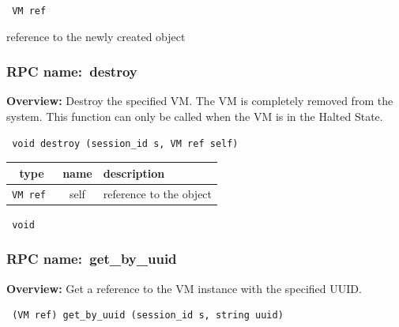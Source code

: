 \vspace{0.3cm}

{\tt 
VM ref
}


reference to the newly created object
\vspace{0.3cm}
\vspace{0.3cm}
\vspace{0.3cm}
\subsubsection{RPC name:~destroy}

{\bf Overview:} 
Destroy the specified VM.  The VM is completely removed from the system. 
This function can only be called when the VM is in the Halted State.

\begin{verbatim} void destroy (session_id s, VM ref self)\end{verbatim}



 
\vspace{0.3cm}
\begin{tabular}{|c|c|p{7cm}|}
 \hline
{\bf type} & {\bf name} & {\bf description} \\ \hline
{\tt VM ref } & self & reference to the object \\ \hline 

\end{tabular}

\vspace{0.3cm}

{\tt 
void
}



\vspace{0.3cm}
\vspace{0.3cm}
\vspace{0.3cm}
\subsubsection{RPC name:~get\_by\_uuid}

{\bf Overview:} 
Get a reference to the VM instance with the specified UUID.

\begin{verbatim} (VM ref) get_by_uuid (session_id s, string uuid)\end{verbatim}



